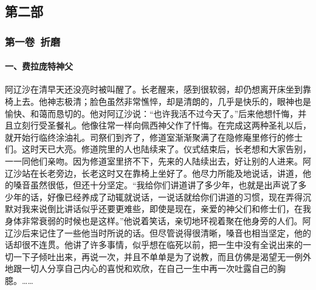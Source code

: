\subsection*{第二部}


\subsubsection*{第一卷\ 折磨}

\paragraph*{一、费拉庞特神父}
\par 阿辽沙在清早天还没亮时被叫醒了。长老醒来，感到很软弱，却仍想离开床坐到靠椅上去。他神志极清；脸色虽然非常憔悴，却是清朗的，几乎是快乐的，眼神也是愉快、和蔼而恳切的。他对阿辽沙说：“也许我活不过今天了。”后来他想忏悔，并且立刻行受圣餐礼。他像往常一样向佩西神父作了忏悔。在完成这两种圣礼以后，就开始行临终涂油礼。司祭们到齐了，修道室渐渐聚满了在隐修庵里修行的修士们。这时天已大亮。修道院里的人也陆续来了。仪式结束后，长老想和大家告别，一一同他们亲吻。因为修道室里挤不下，先来的人陆续出去，好让别的人进来。阿辽沙站在长老旁边，长老这时又在靠椅上坐好了。他尽力所能及地说话，讲道，他的嗓音虽然很低，但还十分坚定。“我给你们讲道讲了多少年，也就是出声说了多少年的话，好像已经养成了动辄就说话，一说话就给你们讲道的习惯，现在弄得沉默对我来说倒比讲话似乎还要更难些，即使是现在，亲爱的神父们和修士们，在我身体非常衰弱的时候也是这样。”他说着笑话，亲切地环视着聚在他身旁的人们。阿辽沙后来记住了一些他当时所说的话。但尽管说得很清晰，嗓音也相当坚定，他的话却很不连贯。他讲了许多事情，似乎想在临死以前，把一生中没有全说出来的一切一下子倾吐出来，再说一次，并且不单单是为了说教，而且仿佛是渴望无一例外地跟一切人分享自己内心的喜悦和欢欣，在自己一生中再一次吐露自己的胸臆。……
